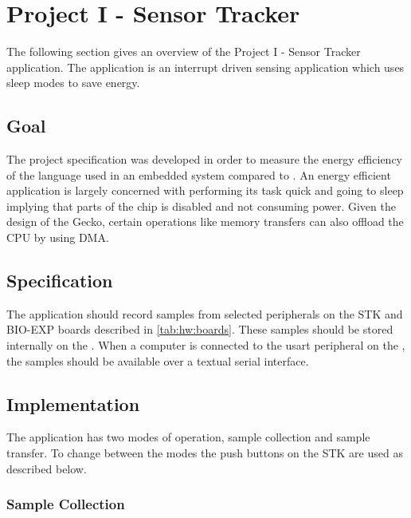 \section{Project I - Sensor Tracker}
\label{sec:impl:project:i}

The following section gives an overview of the Project I - Sensor Tracker application.
The application is an interrupt driven sensing application which uses sleep modes to save energy.

\subsection{Goal}
The project specification was developed in order to measure the energy efficiency of the {\rust} language used in an embedded system compared to {\C}.
An energy efficient application is largely concerned with performing its task quick and going to sleep implying that parts of the chip is disabled and not consuming power.
Given the design of the Gecko, certain operations like memory transfers can also offload the CPU by using DMA.


\subsection{Specification}

The application should record samples from selected peripherals on the STK and BIO-EXP boards described in \autoref{tab:hw:boards}.
These samples should be stored internally on the {\gecko}.
When a computer is connected to the \gls{usart} peripheral on the {\gecko}, the samples should be available over a textual serial interface.

\subsection{Implementation}

The application has two modes of operation, sample collection and sample transfer.
To change between the modes the push buttons on the STK are used as described below.

\subsubsection{Sample Collection}
\label{sec:project:i:sample-collection}

